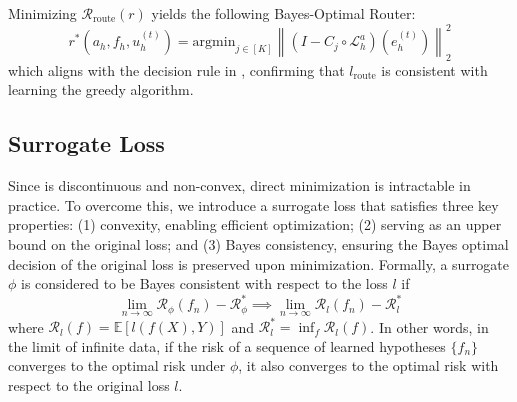\documentclass{article} %
\begin{document}

Minimizing $\mathcal{R}_{\text{route}}\left(r\right)$ yields the following Bayes-Optimal Router:
\begin{equation}\label{eq:bayesoptimalrouter}
    r^*(a_h, f_h, u^{(t)}_h) = \text{argmin}_{j \in [K]} \left\|\left( I - C_{j} \circ \mathcal{L}_{h}^a\right)\left(e^{(t)}_h\right)\right\|^2_2
\end{equation} 
which aligns with the decision rule in , confirming that $l_{\text{route}}$ is consistent with learning the greedy algorithm.

\subsection{Surrogate Loss}

Since  is discontinuous and non-convex, direct minimization is intractable in practice. To overcome this, we introduce a surrogate loss that satisfies three key properties: (1) convexity, enabling efficient optimization; (2) serving as an upper bound on the original loss; and (3) Bayes consistency, ensuring the Bayes optimal decision of the original loss is preserved upon minimization. Formally, a surrogate $\phi$ is considered to be Bayes consistent with respect to the loss $l$ if 
\begin{equation*}
    \lim_{n \to \infty} \mathcal{R}_{\phi}(f_n) - \mathcal{R}_{\phi}^* \implies \lim_{n \to \infty} \mathcal{R}_{l}(f_n) - \mathcal{R}_{l}^* 
\end{equation*}
where $\mathcal{R}_{l}(f) = \mathbb{E}\left[l(f(X), Y)\right]$ and $\mathcal{R}_{l}^* = \inf_f\mathcal{R}_{l}(f)$. In other words, in the limit of infinite data, if the risk of a sequence of learned hypotheses $\{f_n\}$ converges to the optimal risk under $\phi$, it also converges to the optimal risk with respect to the original loss $l$.
\end{document}
